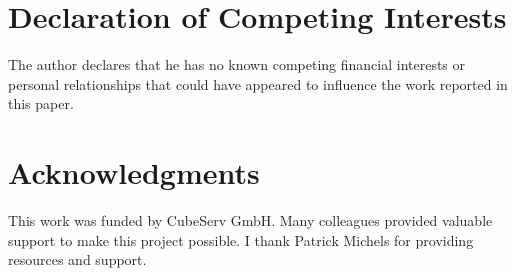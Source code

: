 \documentclass[preprint,12pt]{elsarticle}
\begin{document}
\section*{Declaration of Competing Interests} 
The author declares that he has no known competing financial interests or personal relationships that could have appeared to influence the work reported in this paper.

\section*{Acknowledgments}

This work was funded by CubeServ GmbH.
Many colleagues provided valuable support to make this project possible.
I thank
Patrick Michels for providing resources and support.
\end{document}
